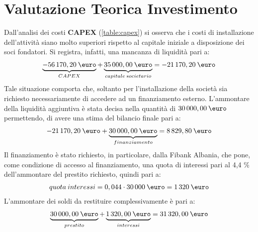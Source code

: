 \chapter[Valutazione Teorica Investimento]{Valutazione Teorica Investimento}
Dall'analisi dei costi \textbf{CAPEX} (\ref{table:capex}) si osserva che i costi di installazione dell'attività siano molto superiori rispetto al capitale iniziale a disposizione dei soci fondatori. \newline
Si registra, infatti, una mancanza di liquidità pari a:
	\begin{equation}
	\label{eq:bilancio_installazione}
	\begin{split}
 		\underbrace{-56\thinspace 170,20 \: \mbox{\euro}}_{CAPEX} + \underbrace{35\thinspace 000,00 \: \mbox{\euro}}_{capitale \: societario} = -21\thinspace 170,20 \: \mbox{\euro}
 	\end{split}
	\end{equation}
Tale situazione comporta che, soltanto per l'installazione della società sia richiesto necessariamente di accedere ad un finanziamento esterno. \newline L'ammontare della liquidità aggiuntiva è stata decisa nella quantità di $30\thinspace 000,00 \: \mbox{\euro}$ permettendo, di avere una stima del bilancio finale pari a:
	\begin{equation}
	\label{eq:bilancio_finale_installazione}
	\begin{split}
		-21\thinspace 170,20 \: \mbox{\euro} + \underbrace{30\thinspace 000,00 \: \mbox{\euro}}_{finanziamento} = 8\thinspace 829,80 \: \mbox{\euro}
 	\end{split}
	\end{equation}
Il finanziamento è stato richiesto, in particolare, dalla \ac{Fibank Albania}, che pone, come condizione di accesso al finanziamento, una quota di interessi pari al 4,4 \% dell'ammontare del prestito richiesto, quindi pari a:
	\begin{equation}
	\label{eq:interessi_fibank}
	\begin{split}
		quota \: interessi = 0,044 \cdot 30\thinspace 000 \: \mbox{\euro} = 1\thinspace 320 \:\mbox{\euro} 
	\end{split}
	\end{equation}
L'ammontare dei soldi da restituire complessivamente è pari a:
	\begin{equation}
	\label{eq:somma_restituita}
	\begin{split}
		\underbrace{30\thinspace 000,00 \: \mbox{\euro}}_{prestito} + 
		\underbrace{1\thinspace 320,00 \: \mbox{\euro}}_{interessi} = 
		31\thinspace 320,00 \: \mbox{\euro}
	\end{split}
	\end{equation}
